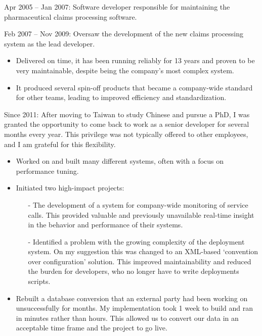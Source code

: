 \documentclass[10pt,a4paper]{../altacv}
\begin{document}
	Apr 2005 -- Jan 2007: Software developer responsible for maintaining the pharmaceutical claims processing software.
	
	\medskip
	
	Feb 2007 -- Nov 2009: Oversaw the development of the new claims processing system as the lead developer.
	
	\medskip
	
	\begin{itemize}
		\item Delivered on time, it has been running reliably for 13 years and proven to be very maintainable, despite being the company's most complex system.
		\item It produced several spin-off products that became a company-wide standard for other teams, leading to improved efficiency and standardization.
	\end{itemize}
	
	\medskip
	
	Since 2011: After moving to Taiwan to study Chinese and pursue a PhD, I was granted the opportunity to come back to work as a senior developer for several months every year. This privilege was not typically offered to other employees, and I am grateful for this flexibility.
	
	
	\medskip
	
	\begin{itemize}
		\item Worked on and built many different systems, often with a focus on performance tuning.
		\item Initiated two high-impact projects:
		\begin{itemize}
			\item[-] The development of a system for company-wide monitoring of service calls. This provided valuable and previously unavailable real-time insight in the behavior and performance of their systems.
			\item[-] Identified a problem with the growing complexity of the deployment system. On my suggestion this was changed to an XML-based ‘convention over configuration' solution. This improved maintainability and reduced the burden for developers, who no longer have to write deployments scripts.
		\end{itemize}
		\item Rebuilt a database conversion that an external party had been working on unsuccessfully for months. My implementation took 1 week to build and ran in minutes rather than hours. This allowed us to convert our data in an acceptable time frame and the project to go live.
	\end{itemize}
	
\end{document}
